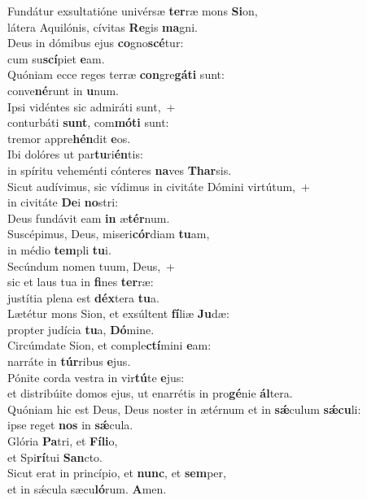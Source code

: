 \evenverse Fundátur exsultatióne univérsæ \textbf{ter}ræ mons \textbf{Si}on,~\*\\
\evenverse látera Aquilónis, cívitas \textbf{Re}gis \textbf{ma}gni.\\
\oddverse Deus in dómibus ejus \textbf{co}gno\textbf{scé}tur:~\*\\
\oddverse cum su\textbf{scí}piet \textbf{e}am.\\
\evenverse Quóniam ecce reges terræ \textbf{con}gre\textbf{gá}\textbf{ti} sunt:~\*\\
\evenverse conve\textbf{né}runt in \textbf{u}num.\\
\oddverse Ipsi vidéntes sic admiráti sunt,~+\\
\oddverse  conturbáti \textbf{sunt}, com\textbf{mó}\textbf{ti} sunt:~\*\\
\oddverse tremor appre\textbf{hén}dit \textbf{e}os.\\
\evenverse Ibi dolóres ut par\textbf{tu}ri\textbf{én}tis:~\*\\
\evenverse in spíritu veheménti cónteres \textbf{na}ves \textbf{Thar}sis.\\
\oddverse Sicut audívimus, sic vídimus in civitáte Dómini virtútum,~+\\
\oddverse  in civitáte \textbf{De}i \textbf{no}stri:~\*\\
\oddverse Deus fundávit eam \textbf{in} æ\textbf{tér}num.\\
\evenverse Suscépimus, Deus, miseri\textbf{cór}diam \textbf{tu}am,~\*\\
\evenverse in médio \textbf{tem}pli \textbf{tu}i.\\
\oddverse Secúndum nomen tuum, Deus,~+\\
\oddverse  sic et laus tua in \textbf{fi}nes \textbf{ter}ræ:~\*\\
\oddverse justítia plena est \textbf{déx}tera \textbf{tu}a.\\
\evenverse Lætétur mons Sion, et exsúltent \textbf{fí}liæ \textbf{Ju}dæ:~\*\\
\evenverse propter judícia \textbf{tu}a, \textbf{Dó}mine.\\
\oddverse Circúmdate Sion, et comple\textbf{ctí}mini \textbf{e}am:~\*\\
\oddverse narráte in \textbf{túr}ribus \textbf{e}jus.\\
\evenverse Pónite corda vestra in vir\textbf{tú}te \textbf{e}jus:~\*\\
\evenverse et distribúite domos ejus, ut enarrétis in pro\textbf{gé}nie \textbf{ál}tera.\\
\oddverse Quóniam hic est Deus, Deus noster in ætérnum et in \textbf{sǽ}culum \textbf{sǽ}\textbf{cu}li:~\*\\
\oddverse ipse reget \textbf{nos} in \textbf{sǽ}cula.\\
\evenverse Glória \textbf{Pa}tri, et \textbf{Fí}\textbf{li}o,~\*\\
\evenverse et Spi\textbf{rí}tui \textbf{San}cto.\\
\oddverse Sicut erat in princípio, et \textbf{nunc}, et \textbf{sem}per,~\*\\
\oddverse et in sǽcula sæcu\textbf{ló}rum. \textbf{A}men.\\
